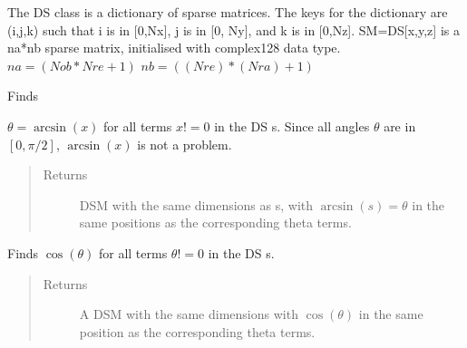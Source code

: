 \documentclass[letterpaper,10pt,english]{sphinxmanual}
\begin{document}
\begin{fulllineitems}
\label{index:DictionarySparseMatrix.DS}
The DS class is a dictionary of sparse matrices.
The keys for the dictionary are (i,j,k) such that i is in {[}0,Nx{]},
j is in {[}0, Ny{]}, and k is in {[}0,Nz{]}.
SM=DS{[}x,y,z{]} is a na*nb sparse matrix, initialised with complex128 data type.
\(na=(Nob*Nre+1)\)
\(nb=((Nre)*(Nra)+1)\)

\begin{fulllineitems}
\label{index:DictionarySparseMatrix.DS.asin}
Finds

\(\theta=\arcsin(x)\) for all terms \(x != 0\) in     the DS s. Since all angles     \(\theta\) are in \([0,\pi /2]\),     \(\arcsin(x)\) is not a problem.
\begin{quote}\begin{description}
\item[{Returns}] \leavevmode
DSM with the same dimensions as s, with     \(\arcsin(s)=\theta\) in      the same positions as the corresponding theta terms.

\end{description}\end{quote}

\end{fulllineitems}


\begin{fulllineitems}
\label{index:DictionarySparseMatrix.DS.cos}
Finds \(\cos(\theta)\) for all terms     \(\theta != 0\) in the DS s.
\begin{quote}\begin{description}
\item[{Returns}] \leavevmode
A DSM with the same dimensions with     \(\cos(\theta)\) in the      same position as the corresponding theta terms.

\end{description}\end{quote}

\end{fulllineitems}


\end{fulllineitems}
\end{document}
